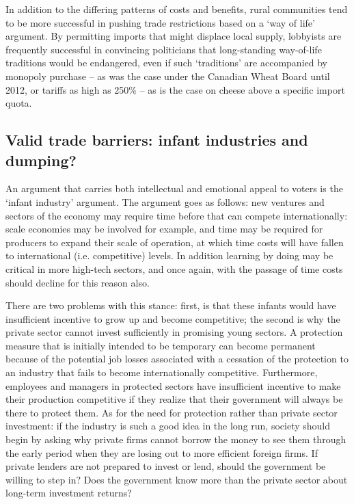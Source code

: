 In addition to the differing patterns of costs and benefits, rural communities tend to be more successful in pushing trade restrictions based on a `way of life' argument. By permitting imports that might displace local supply, lobbyists are frequently successful in convincing politicians that long-standing way-of-life traditions would be endangered, even if such `traditions' are accompanied by monopoly purchase -- as was the case under the Canadian Wheat Board until 2012, or tariffs as high as 250\% -- as is the case on cheese above a specific import quota. 

\subsection*{Valid trade barriers: infant industries and dumping?}

An argument that carries both intellectual and emotional appeal to voters is the `infant industry' argument. The argument goes as follows: new ventures and sectors of the economy may require time before that can compete internationally: scale economies may be involved for example, and time may be required for producers to expand their scale of operation, at which time costs will have fallen to international (i.e. competitive) levels. In addition learning by doing may be critical in more high-tech sectors, and once again, with the passage of time costs should decline for this reason also.

There are two problems with this stance: first, is that these infants would have insufficient incentive to grow up and become competitive; the second is why the private sector cannot invest sufficiently in promising young sectors.  A protection measure that is initially intended to be temporary can become permanent because of the potential job losses associated with a cessation of the protection to an industry that fails to become internationally competitive. Furthermore, employees and managers in protected sectors have insufficient incentive to make their production competitive if they realize that their government will always be there to protect them. As for the need for protection rather than private sector investment: if the industry is such a good idea in the long run, society should begin by asking why private firms cannot borrow the money to see them through the early period when they are losing out to more efficient foreign firms. If private lenders are not prepared to invest or lend, should the government be willing to step in? Does the government know more than the private sector about long-term investment returns?

